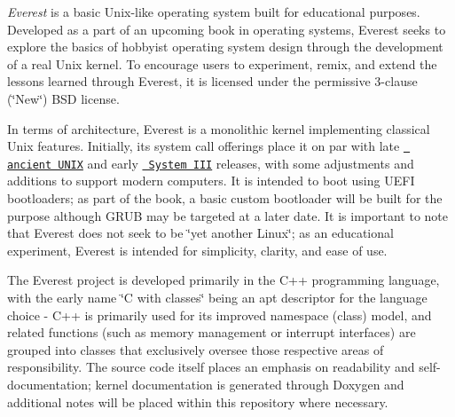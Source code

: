 {\itshape Everest} is a basic Unix-\/like operating system built for educational purposes. Developed as a part of an upcoming book in operating systems, Everest seeks to explore the basics of hobbyist operating system design through the development of a real Unix kernel. To encourage users to experiment, remix, and extend the lessons learned through Everest, it is licensed under the permissive 3-\/clause (\char`\"{}\+New\char`\"{}) BSD license.

In terms of architecture, Everest is a monolithic kernel implementing classical Unix features. Initially, its system call offerings place it on par with late \href{https://en.wikipedia.org/wiki/Ancient_UNIX}{\texttt{ ancient UNIX}} and early \href{https://en.wikipedia.org/wiki/UNIX_System_III}{\texttt{ System III}} releases, with some adjustments and additions to support modern computers. It is intended to boot using UEFI bootloaders; as part of the book, a basic custom bootloader will be built for the purpose although GRUB may be targeted at a later date. It is important to note that Everest does not seek to be \char`\"{}yet another Linux\char`\"{}; as an educational experiment, Everest is intended for simplicity, clarity, and ease of use.

The Everest project is developed primarily in the C++ programming language, with the early name \char`\"{}\+C with classes\char`\"{} being an apt descriptor for the language choice -\/ C++ is primarily used for its improved namespace (class) model, and related functions (such as memory management or interrupt interfaces) are grouped into classes that exclusively oversee those respective areas of responsibility. The source code itself places an emphasis on readability and self-\/documentation; kernel documentation is generated through Doxygen and additional notes will be placed within this repository where necessary. 